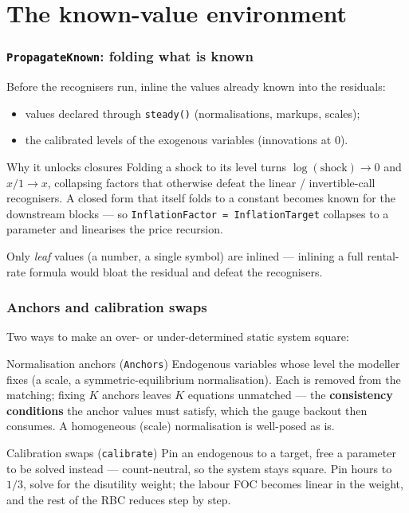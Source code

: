 \documentclass[10pt,slidestop]{beamer}
\newcommand{\code}[1]{\texttt{#1}}
\begin{document}
\section{The known-value environment}

\begin{frame}\frametitle{\texttt{PropagateKnown}: folding what is known}
  Before the recognisers run, inline the values already known into the residuals:

  \begin{itemize}
  \item values declared through \code{steady()} (normalisations, markups, scales);
  \item the calibrated levels of the exogenous variables (innovations at 0).
  \end{itemize}

  \smallskip
  \begin{block}{Why it unlocks closures}
    Folding a shock to its level turns $\log(\text{shock})\to 0$ and
    $x/1 \to x$, collapsing factors that otherwise defeat the linear /
    invertible-call recognisers. A closed form that itself folds to a constant
    becomes known for the downstream blocks --- so
    \code{InflationFactor = InflationTarget} collapses to a parameter and
    linearises the price recursion.
  \end{block}

  \smallskip
  Only \emph{leaf} values (a number, a single symbol) are inlined --- inlining a
  full rental-rate formula would bloat the residual and defeat the recognisers.
\end{frame}

\begin{frame}\frametitle{Anchors and calibration swaps}
  Two ways to make an over- or under-determined static system square:

  \begin{block}{Normalisation anchors (\texttt{Anchors})}
    Endogenous variables whose level the modeller fixes (a scale, a
    symmetric-equilibrium normalisation). Each is removed from the matching;
    fixing $K$ anchors leaves $K$ equations unmatched --- the \textbf{consistency
    conditions} the anchor values must satisfy, which the gauge backout then
    consumes. A homogeneous (scale) normalisation is well-posed as is.
  \end{block}

  \begin{block}{Calibration swaps (\texttt{calibrate})}
    Pin an endogenous to a target, free a parameter to be solved instead ---
    count-neutral, so the system stays square. Pin hours to $1/3$, solve for the
    disutility weight; the labour FOC becomes linear in the weight, and the rest
    of the RBC reduces step by step.
  \end{block}
\end{frame}
\end{document}
